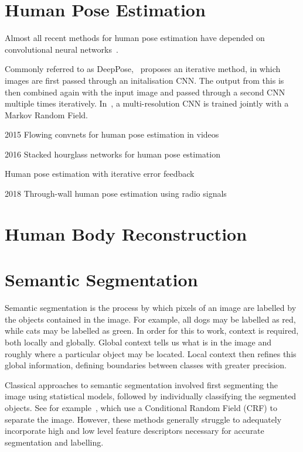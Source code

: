 \section{Human Pose Estimation}

Almost all recent methods for human pose estimation have depended on
convolutional neural
networks~\cite{toshev2014deeppose,tompson2014joint,pfister2015flowing,newell2016stacked,carreira2016human,zhao2018through}.

Commonly referred to as DeepPose,~\cite{toshev2014deeppose} proposes
an iterative method, in which images are first passed through an
initalisation CNN. The output from this is then combined again with
the input image and passed through a second CNN multiple times
iteratively. In~\cite{tompson2014joint}, a multi-resolution CNN is
trained jointly with a Markov Random Field.



2015
Flowing convnets for human pose estimation in videos

2016
Stacked hourglass networks for human pose estimation

Human pose estimation with iterative error feedback

2018
Through-wall human pose estimation using radio signals

\section{Human Body Reconstruction}




\section{Semantic Segmentation}

Semantic segmentation is the process by which pixels of an image are
labelled by the objects contained in the image. For example, all dogs
may be labelled as red, while cats may be labelled as green. In order
for this to work, context is required, both locally and
globally. Global context tells us what is in the image and roughly
where a particular object may be located. Local context then refines
this global information, defining boundaries between classes with
greater precision.

Classical approaches to semantic segmentation involved first
segmenting the image using statistical models, followed by
individually classifying the segmented objects. See for
example~\cite{arbelaez2012semantic,carreira2012semantic}, which use a
Conditional Random Field (CRF) to separate the image. However, these
methods generally struggle to adequately incorporate high and low
level feature descriptors necessary for accurate segmentation and
labelling.


